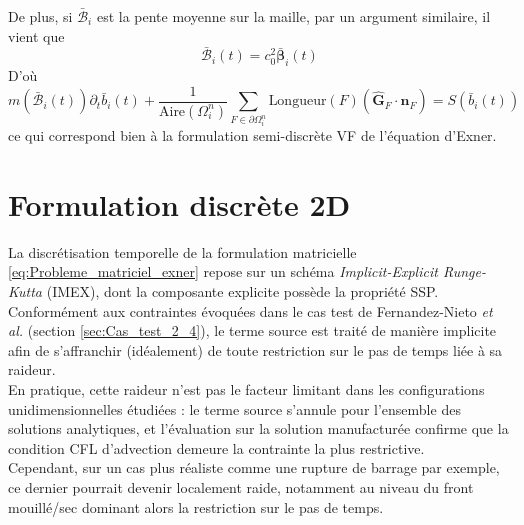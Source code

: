 \documentclass[11pt, a4paper, oneside]{report}
\begin{document}
De plus, si $\bm{\bar{\mathcal{B}}}_i$ est la pente moyenne sur la maille, par un argument similaire, il vient que
\begin{equation}
    \bm{\bar{\mathcal{B}}}_i(t) = c_0^2 \bm{\bar{\beta}}_i(t)
\end{equation}
D'où
\begin{equation}
    m \left( \bm{\bar{\mathcal{B}}}_i(t) \right) \partial_t \bar{b}_i(t) + \frac{1}{\text{Aire}\left( \Omega_i^n \right)} \sum_{F \in \partial \Omega_i^n} \text{Longueur}(F) \left( \bm{\widehat{G}}_F \cdot \bm{n}_F \right) = S \left( \bar{b}_i(t) \right)
\end{equation}
ce qui correspond bien à la formulation semi-discrète VF de l'équation d'Exner.

\section{Formulation discrète 2D}

La discrétisation temporelle de la formulation matricielle \eqref{eq:Probleme_matriciel_exner} repose sur un schéma \textit{Implicit-Explicit Runge-Kutta} (IMEX), dont la composante explicite possède la propriété SSP. Conformément aux contraintes évoquées dans le cas test de Fernandez-Nieto \textit{et al.} (section \ref{sec:Cas_test_2_4}), le terme source est traité de manière implicite afin de s'affranchir (idéalement) de toute restriction sur le pas de temps liée à sa raideur. \\
En pratique, cette raideur n'est pas le facteur limitant dans les configurations unidimensionnelles étudiées : le terme source s'annule pour l'ensemble des solutions analytiques, et l'évaluation sur la solution manufacturée confirme que la condition CFL d'advection demeure la contrainte la plus restrictive. \\
Cependant, sur un cas plus réaliste comme une rupture de barrage par exemple, ce dernier pourrait devenir localement raide, notamment au niveau du front mouillé/sec dominant alors la restriction sur le pas de temps. \\
\end{document}
